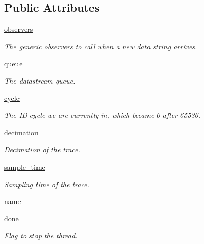 \subsection*{\-Public \-Attributes}
\begin{DoxyCompactItemize}
\item 
\hyperlink{classpyrtai_1_1data__poller_1_1_data_poller_ae072250fdb6ecbf735eb65527d03c379}{observers}
\begin{DoxyCompactList}\small\item\em \-The generic observers to call when a new data string arrives. \end{DoxyCompactList}\item 
\hyperlink{classpyrtai_1_1data__poller_1_1_data_poller_a0ce1219ca4c15a18ea8a0c7c18fa021b}{queue}
\begin{DoxyCompactList}\small\item\em \-The datastream queue. \end{DoxyCompactList}\item 
\hyperlink{classpyrtai_1_1data__poller_1_1_data_poller_afb34fdcf6e14cf60c14e277ad94f2500}{cycle}
\begin{DoxyCompactList}\small\item\em \-The \-I\-D cycle we are currently in, which became 0 after 65536. \end{DoxyCompactList}\item 
\hyperlink{classpyrtai_1_1data__poller_1_1_data_poller_abc7d7ce251da1b17f59e05945ac30042}{decimation}
\begin{DoxyCompactList}\small\item\em \-Decimation of the trace. \end{DoxyCompactList}\item 
\hyperlink{classpyrtai_1_1data__poller_1_1_data_poller_a8e9f007aa9f89f257feef4c6b7c561fb}{sample\-\_\-time}
\begin{DoxyCompactList}\small\item\em \-Sampling time of the trace. \end{DoxyCompactList}\item 
\hyperlink{classpyrtai_1_1data__poller_1_1_data_poller_a0606534bb1241636b86d367796b477f1}{name}
\item 
\hyperlink{classpyrtai_1_1data__poller_1_1_data_poller_ac31bc2483eaa3d8d7a47136f9dfc1899}{done}
\begin{DoxyCompactList}\small\item\em \-Flag to stop the thread. \end{DoxyCompactList}\end{DoxyCompactItemize}



